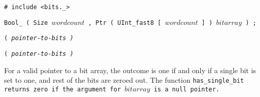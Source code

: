 
\tt{# include <bits._>}

\tt{Bool_}  \tt{( Size} $wordcount$
\tt{, Ptr ( UInt_fast8 [} $wordcount$ \tt{] )} $bitarray$ \tt{) ;}

\s\tt{(}
\it{pointer-to-bits} \tt{)}

\s\s\tt{(}
\it{pointer-to-bits} \tt{)}

\enlargethispage*{\baselineskip}
\pagebreak


For a valid pointer to a bit array, the outcome is one if and only if
a single bit is set to one, and rest of the bits are zeroed out.
The function \tt{has_single_bit} returns zero
if the argument for $bitarray$ is a null pointer.
